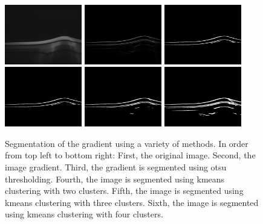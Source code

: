 \begin{figure}[H]
	\centering
	\includegraphics[width=0.30\textwidth]{../images/exp-original.png}
	\includegraphics[width=0.30\textwidth]{../images/exp-gradient.png}
	\includegraphics[width=0.30\textwidth]{../images/exp-mask-otsu.png}
	\includegraphics[width=0.30\textwidth]{../images/exp-mask-kmeans-2.png}
	\includegraphics[width=0.30\textwidth]{../images/exp-mask-kmeans-3.png}
	\includegraphics[width=0.30\textwidth]{../images/exp-mask-kmeans-4.png}
	\caption{Segmentation of the gradient using a variety of methods. In order from top left to bottom right: First, the original image. Second, the image gradient. Third, the gradient is segmented using otsu thresholding. Fourth, the image is segmented using kmeans clustering with two clusters. Fifth, the image is segmented using kmeans clustering with three clusters. Sixth, the image is segmented using kmeans clustering with four clusters.}
	\label{fig:segmentation-gradient}
\end{figure}
%
